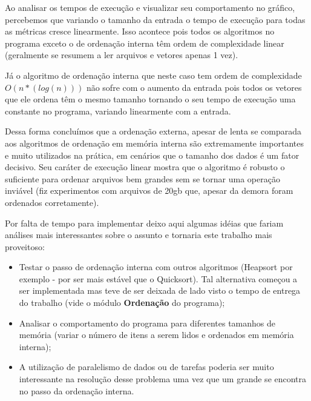 \documentclass[12pt]{article}
\begin{document}
Ao analisar os tempos de execução e visualizar seu comportamento no gráfico, percebemos que variando
o tamanho da entrada o tempo de execução para todas as métricas cresce linearmente. Isso acontece pois
 todos os algoritmos no programa exceto o de ordenação interna têm ordem de complexidade linear (geralmente se resumem a ler arquivos e vetores apenas 1 vez). 
 
Já o algoritmo de ordenação interna que neste caso tem ordem de complexidade $O(n*(log(n)))$ não sofre
 com o aumento da entrada pois todos os vetores que ele ordena têm o mesmo tamanho tornando o seu tempo de execução uma constante no programa, variando linearmente com a entrada.
 
Dessa forma concluímos que a ordenação externa, apesar de lenta se comparada aos algoritmos de ordenação 
em memória interna são extremamente importantes e muito utilizados na prática, em cenários que o tamanho
 dos dados é um fator decisivo. Seu caráter de execução linear mostra que o algoritmo é robusto o
 suficiente para ordenar arquivos bem grandes sem se tornar uma operação inviável (fiz experimentos com arquivos de 20gb que, apesar da demora foram ordenados corretamente).

Por falta de tempo para implementar deixo aqui algumas idéias que fariam análises mais interessantes sobre o assunto e tornaria este trabalho mais proveitoso:
\begin{itemize}
\item Testar o passo de ordenação interna com outros algoritmos (Heapsort por exemplo - por
ser mais estável que o Quicksort). Tal alternativa começou a ser implementada mas teve de ser deixada de lado visto o tempo de entrega do trabalho (vide o módulo \textbf{Ordenação} do programa);
\item Analisar o comportamento do programa para diferentes tamanhos de memória (variar o 
número de itens a serem lidos e ordenados em memória interna);
\item A utilização de paralelismo de dados ou de tarefas poderia ser muito interessante na resolução desse problema uma vez que um grande se encontra no passo da ordenação interna.
\end{itemize}
\end{document}
